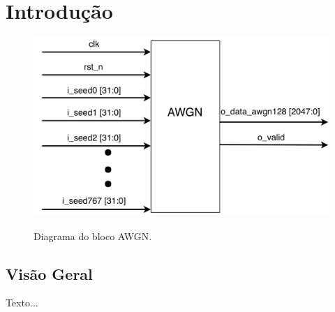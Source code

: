 \section{Introdução} %
\label{sec:introdução}

\begin{figure}[!htb]
  \caption{Diagrama do bloco AWGN.}
  \vspace{0.2cm}
  \includegraphics[width=\linewidth]{images/bloco.png}
  \label{fig:top}
\end{figure}

\subsection{Visão Geral}
Texto...

